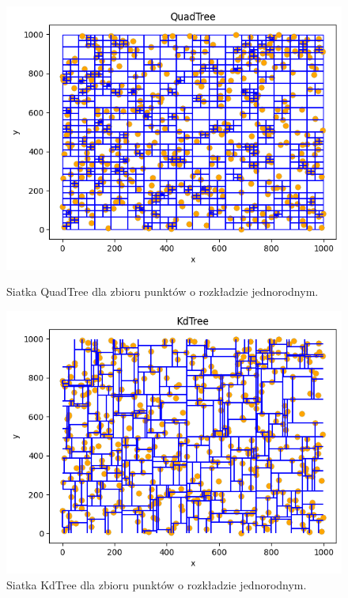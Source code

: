 \documentclass{lab}
\begin{document}
\begin{figure}[H]
  \centering
  \begin{minipage}{0.495\textwidth}
      \centering
      \includegraphics[width=1\textwidth]{resources/uniform_QuadTree.png}
      \caption{Siatka QuadTree dla zbioru punktów o rozkładzie jednorodnym.}
      \label{fig:uniform_QuadTree}
  \end{minipage}
  \begin{minipage}{0.495\textwidth}
      \centering
      \includegraphics[width=1\textwidth]{resources/uniform_KdTree.png}
      \caption{Siatka KdTree dla zbioru punktów o rozkładzie jednorodnym.}
      \label{fig:uniform_KdTree}
  \end{minipage}
\end{figure}
\end{document}
